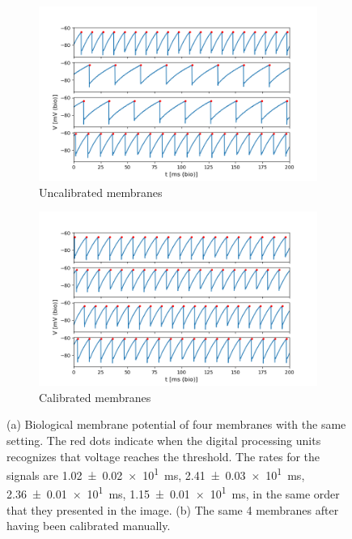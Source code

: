 \documentclass[10pt,a4paper]{article}
\begin{document}
\begin{figure}[ht]
    \centering
    \begin{subfigure}[t]{\textwidth}
        \includegraphics[width=\textwidth]{figures/4membranes.png}
        \caption{Uncalibrated membranes}
    \end{subfigure}
    \begin{subfigure}[b]{\textwidth}
        \includegraphics[width=\textwidth]{figures/4membranes-calibrated.png}
        \caption{Calibrated membranes}
    \end{subfigure}
    \caption{(a) Biological membrane potential of four membranes with the same
    setting. The red dots indicate when the digital processing units recognizes
    that voltage reaches the threshold. The rates for the signals are
    \SI{1.02(2)e1}{\milli\second}, \SI{2.41(3)e1}{\milli\second},
    \SI{2.36(1)e1}{\milli\second}, \SI{1.15(1)e1}{\milli\second}, in the same
    order that they presented in the image.
    (b) The same 4 membranes after having been calibrated manually.}
    \label{fig:4membranes}
\end{figure}
\end{document}
